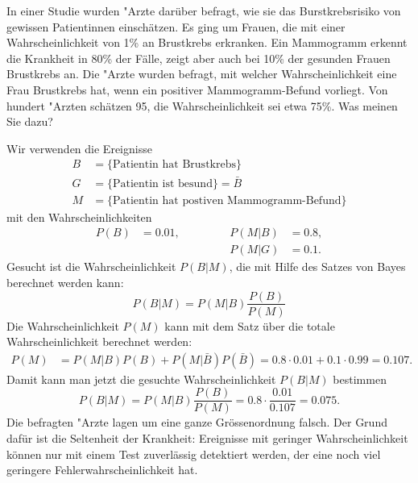 In einer Studie wurden "Arzte darüber befragt, wie sie das Burstkrebsrisiko
von gewissen Patientinnen einschätzen.
Es ging um Frauen, die mit einer Wahrscheinlichkeit von 1\% an
Brustkrebs erkranken.
Ein Mammogramm erkennt die Krankheit in 80\% der Fälle, zeigt aber auch
bei 10\% der gesunden Frauen Brustkrebs an.
Die "Arzte wurden befragt, mit welcher Wahrscheinlichkeit eine Frau
Brustkrebs hat, wenn ein positiver Mammogramm-Befund vorliegt.
Von hundert "Arzten schätzen 95, die Wahrscheinlichkeit sei etwa 75\%.
Was meinen Sie dazu?

\begin{loesung}
Wir verwenden die Ereignisse
\begin{align*}
B&=\{\text{Patientin hat Brustkrebs}\}\\
G&=\{\text{Patientin ist besund}\} =\bar B\\
M&=\{\text{Patientin hat postiven Mammogramm-Befund}\}
\end{align*}
mit den Wahrscheinlichkeiten
\[
\begin{aligned}
P(B)&=0.01,&&\qquad&P(M|B)&=0.8,\\
    &      &&\qquad&P(M|G)&=0.1.
\end{aligned}
\]
Gesucht ist die Wahrscheinlichkeit $P(B|M)$, die mit Hilfe des Satzes
von Bayes berechnet werden kann:
\[
P(B|M) = P(M|B) \frac{P(B)}{P(M)}
\]
Die Wahrscheinlichkeit $P(M)$ kann mit dem Satz über die totale
Wahrscheinlichkeit berechnet werden:
\begin{align*}
P(M)
&=
P(M|B)P(B)+P(M|\bar B)P(\bar B)
=
0.8\cdot 0.01 + 0.1\cdot 0.99
=
0.107.
\end{align*}
Damit kann man jetzt die gesuchte Wahrscheinlichkeit $P(B|M)$ bestimmen
\[
P(B|M)
=
P(M|B) \frac{P(B)}{P(M)}
=
0.8 \cdot\frac{0.01}{0.107}
=
0.075.
\]
Die befragten "Arzte lagen um eine ganze Grössenordnung falsch.
Der Grund dafür ist die Seltenheit der Krankheit: Ereignisse
mit geringer Wahrscheinlichkeit können nur mit einem Test zuverlässig
detektiert werden, der eine noch viel geringere Fehlerwahrscheinlichkeit hat.
\end{loesung}
